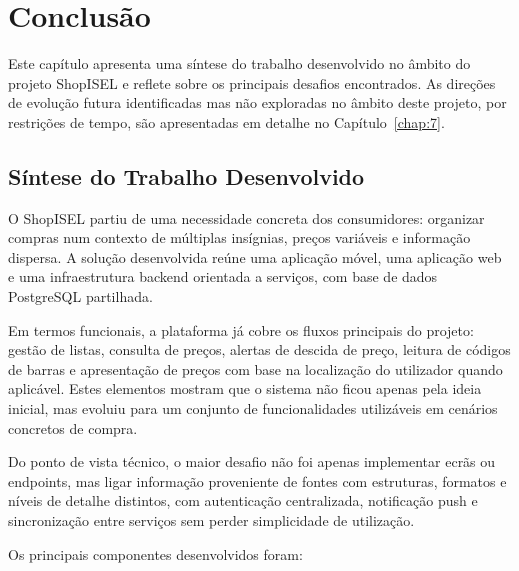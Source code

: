 
\chapter{Conclusão}
\label{chap:8}

Este capítulo apresenta uma síntese do trabalho desenvolvido no âmbito do projeto ShopISEL e reflete sobre os principais desafios encontrados. As direções de evolução futura identificadas mas não exploradas no âmbito deste projeto, por restrições de tempo, são apresentadas em detalhe no Capítulo~\ref{chap:7}.

\section{Síntese do Trabalho Desenvolvido}
\label{sec:8.1}

O ShopISEL partiu de uma necessidade concreta dos consumidores: organizar compras num contexto de múltiplas insígnias, preços variáveis e informação dispersa. A solução desenvolvida reúne uma aplicação móvel, uma aplicação web e uma infraestrutura backend orientada a serviços, com base de dados PostgreSQL partilhada.

Em termos funcionais, a plataforma já cobre os fluxos principais do projeto: gestão de listas, consulta de preços, alertas de descida de preço, leitura de códigos de barras e apresentação de preços com base na localização do utilizador quando aplicável. Estes elementos mostram que o sistema não ficou apenas pela ideia inicial, mas evoluiu para um conjunto de funcionalidades utilizáveis em cenários concretos de compra.

Do ponto de vista técnico, o maior desafio não foi apenas implementar ecrãs ou endpoints, mas ligar informação proveniente de fontes com estruturas, formatos e níveis de detalhe distintos, com autenticação centralizada, notificação push e sincronização entre serviços sem perder simplicidade de utilização.

Os principais componentes desenvolvidos foram:


